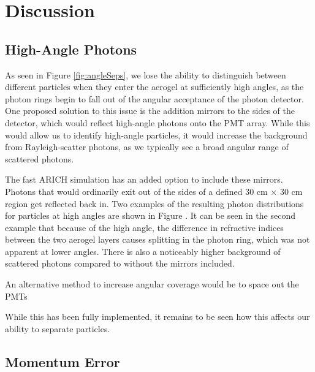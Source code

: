 
\chapter{Discussion}
\label{ch:Discussion}


\section{High-Angle Photons}
As seen in Figure \ref{fig:angleSeps}, we lose the ability to distinguish between different particles when they enter the aerogel at sufficiently high angles, as the photon rings begin to fall out of the angular acceptance of the photon detector.
One proposed solution to this issue is the addition mirrors to the sides of the detector, which would reflect high-angle photons onto the PMT array. 
While this would allow us to identify high-angle particles, it would increase the background from Rayleigh-scatter photons, as we typically see a broad angular range of scattered photons.

The fast ARICH simulation has an added option to include these mirrors.
Photons that would ordinarily exit out of the sides of a defined 30 cm $\times$ 30 cm region get reflected back in.
Two examples of the resulting photon distributions for particles at high angles are shown in Figure .
It can be seen in the second example that because of the high angle, the difference in refractive indices between the two aerogel layers causes splitting in the photon ring, which was not apparent at lower angles.
There is also a noticeably higher background of scattered photons compared to without the mirrors included.

An alternative method to increase angular coverage would be to space out the PMTs

While this has been fully implemented, it remains to be seen how this affects our ability to separate particles. 

\section{Momentum Error}

